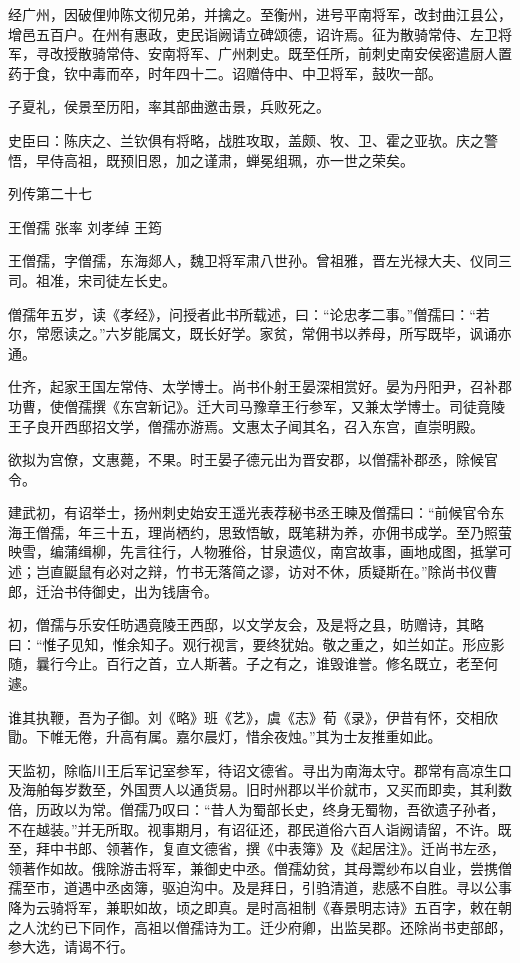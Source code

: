 \documentclass[12pt,UTF8]{ctexbook}
\begin{document}
经广州，因破俚帅陈文彻兄弟，并擒之。至衡州，进号平南将军，改封曲江县公，增邑五百户。在州有惠政，吏民诣阙请立碑颂德，诏许焉。征为散骑常侍、左卫将军，寻改授散骑常侍、安南将军、广州刺史。既至任所，前刺史南安侯密遣厨人置药于食，钦中毒而卒，时年四十二。诏赠侍中、中卫将军，鼓吹一部。

子夏礼，侯景至历阳，率其部曲邀击景，兵败死之。

史臣曰：陈庆之、兰钦俱有将略，战胜攻取，盖颇、牧、卫、霍之亚欤。庆之警悟，早侍高祖，既预旧恩，加之谨肃，蝉冕组珮，亦一世之荣矣。





列传第二十七

王僧孺 张率 刘孝绰 王筠

王僧孺，字僧孺，东海郯人，魏卫将军肃八世孙。曾祖雅，晋左光禄大夫、仪同三司。祖准，宋司徒左长史。

僧孺年五岁，读《孝经》，问授者此书所载述，曰：“论忠孝二事。”僧孺曰：“若尔，常愿读之。”六岁能属文，既长好学。家贫，常佣书以养母，所写既毕，讽诵亦通。

仕齐，起家王国左常侍、太学博士。尚书仆射王晏深相赏好。晏为丹阳尹，召补郡功曹，使僧孺撰《东宫新记》。迁大司马豫章王行参军，又兼太学博士。司徒竟陵王子良开西邸招文学，僧孺亦游焉。文惠太子闻其名，召入东宫，直崇明殿。

欲拟为宫僚，文惠薨，不果。时王晏子德元出为晋安郡，以僧孺补郡丞，除候官令。

建武初，有诏举士，扬州刺史始安王遥光表荐秘书丞王暕及僧孺曰：“前候官令东海王僧孺，年三十五，理尚栖约，思致悟敏，既笔耕为养，亦佣书成学。至乃照萤映雪，编蒲缉柳，先言往行，人物雅俗，甘泉遗仪，南宫故事，画地成图，抵掌可述；岂直鼮鼠有必对之辩，竹书无落简之谬，访对不休，质疑斯在。”除尚书仪曹郎，迁治书侍御史，出为钱唐令。

初，僧孺与乐安任昉遇竟陵王西邸，以文学友会，及是将之县，昉赠诗，其略曰：“惟子见知，惟余知子。观行视言，要终犹始。敬之重之，如兰如芷。形应影随，曩行今止。百行之首，立人斯著。子之有之，谁毁谁誉。修名既立，老至何遽。

谁其执鞭，吾为子御。刘《略》班《艺》，虞《志》荀《录》，伊昔有怀，交相欣勖。下帷无倦，升高有属。嘉尔晨灯，惜余夜烛。”其为士友推重如此。

天监初，除临川王后军记室参军，待诏文德省。寻出为南海太守。郡常有高凉生口及海舶每岁数至，外国贾人以通货易。旧时州郡以半价就市，又买而即卖，其利数倍，历政以为常。僧孺乃叹曰：“昔人为蜀部长史，终身无蜀物，吾欲遗子孙者，不在越装。”并无所取。视事期月，有诏征还，郡民道俗六百人诣阙请留，不许。既至，拜中书郎、领著作，复直文德省，撰《中表簿》及《起居注》。迁尚书左丞，领著作如故。俄除游击将军，兼御史中丞。僧孺幼贫，其母鬻纱布以自业，尝携僧孺至市，道遇中丞卤簿，驱迫沟中。及是拜日，引驺清道，悲感不自胜。寻以公事降为云骑将军，兼职如故，顷之即真。是时高祖制《春景明志诗》五百字，敕在朝之人沈约已下同作，高祖以僧孺诗为工。迁少府卿，出监吴郡。还除尚书吏部郎，参大选，请谒不行。
\end{document}
